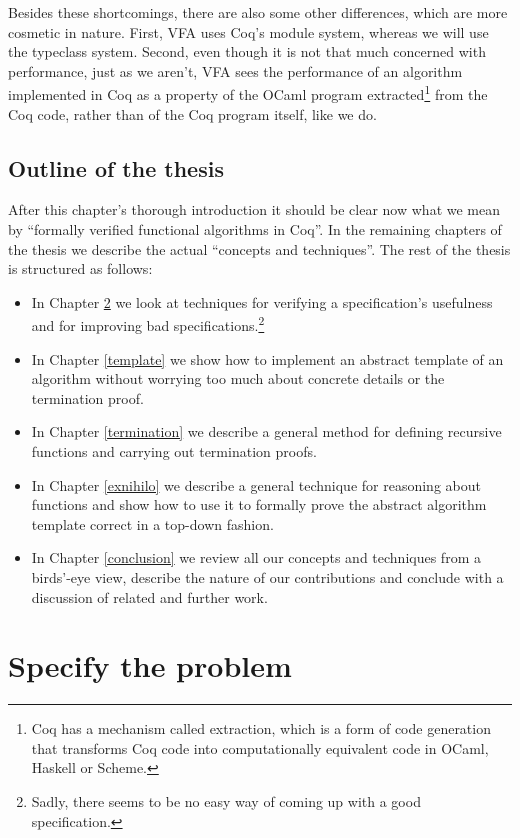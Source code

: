 \documentclass[declaration,mgr,english,shortabstract]{iithesis}
\begin{document}
Besides these shortcomings, there are also some other differences, which are more cosmetic in nature. First, VFA uses Coq's module system, whereas we will use the typeclass system. Second, even though it is not that much concerned with performance, just as we aren't, VFA sees the performance of an algorithm implemented in Coq as a property of the OCaml program extracted\footnote{Coq has a mechanism called extraction, which is a form of code generation that transforms Coq code into computationally equivalent code in OCaml, Haskell or Scheme.} from the Coq code, rather than of the Coq program itself, like we do.

\section{Outline of the thesis} \label{outline}

After this chapter's thorough introduction it should be clear now what we mean by ``formally verified functional algorithms in Coq''. In the remaining chapters of the thesis we describe the actual ``concepts and techniques''. The rest of the thesis is structured as follows:

\begin{itemize}
    \item In Chapter \ref{specify} we look at techniques for verifying a specification's usefulness and for improving bad specifications.\footnote{Sadly, there seems to be no easy way of coming up with a good specification.}
    \item In Chapter \ref{template} we show how to implement an abstract template of an algorithm without worrying too much about concrete details or the termination proof.
    \item In Chapter \ref{termination} we describe a general method for defining recursive functions and carrying out termination proofs.
    \item In Chapter \ref{exnihilo} we describe a general technique for reasoning about functions and show how to use it to formally prove the abstract algorithm template correct in a top-down fashion.
    \item In Chapter \ref{conclusion} we review all our concepts and techniques from a birds'-eye view, describe the nature of our contributions and conclude with a discussion of related and further work.
\end{itemize}

\chapter{Specify the problem} \label{specify}
\end{document}
